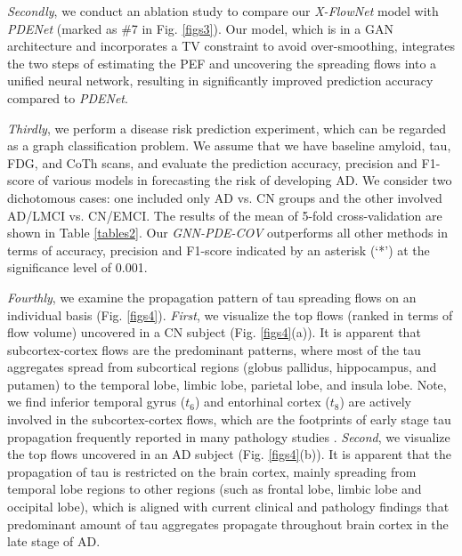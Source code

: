 \documentclass{article}
\begin{document}
\textit{Secondly}, we conduct an ablation study to compare our \textit{X-FlowNet} model with \textit{PDENet} (marked as \#7 in Fig. \ref{figs3}). Our model, which is in a GAN architecture and incorporates a TV constraint to avoid over-smoothing, integrates the two steps of estimating the PEF and uncovering the spreading flows into a unified neural network, resulting in significantly improved prediction accuracy compared to \textit{PDENet}.

\textit{Thirdly}, we perform a disease risk prediction experiment, which can be regarded as a graph classification problem. We assume that we have baseline amyloid, tau, FDG, and CoTh scans, and evaluate the prediction accuracy, precision and F1-score of various models in forecasting the risk of developing AD. We consider two dichotomous cases: one included only AD vs. CN groups and the other involved AD/LMCI vs. CN/EMCI. The results of the mean of 5-fold cross-validation are shown in Table \ref{tables2}. Our \textit{GNN-PDE-COV} outperforms all other methods in terms of accuracy, precision and F1-score indicated by an asterisk (`*') at the significance level of 0.001.


\textit{Fourthly}, we examine the propagation pattern of tau spreading flows on an individual basis (Fig. \ref{figs4}). \textit{First}, we visualize the top flows (ranked in terms of flow volume) uncovered in a CN subject (Fig. \ref{figs4}(a)). It is apparent that subcortex-cortex flows are the predominant patterns, where most of the tau aggregates spread from subcortical regions (globus pallidus, hippocampus, and putamen) to the temporal lobe, limbic lobe, parietal lobe, and insula lobe. Note, we find inferior temporal gyrus ($t_6$) and entorhinal cortex ($t_8$) are actively involved in the subcortex-cortex flows, which are the footprints of early stage tau propagation frequently reported in many pathology studies \cite{lee2022regional,vogel2020spread}. \textit{Second}, we visualize the top flows uncovered in an AD subject (Fig. \ref{figs4}(b)). It is apparent that the propagation of tau is restricted on the brain cortex, mainly spreading from temporal lobe regions to other regions (such as frontal lobe, limbic lobe and occipital lobe), which is aligned with current clinical and pathology findings that predominant amount of tau aggregates propagate throughout brain cortex in the late stage of AD.
\end{document}
